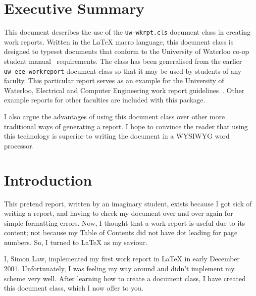 \documentclass{uw-wkrpt}
\begin{document}
\onehalfspacing
\section*{Executive Summary}
{}

\setcounter{page}{3}

This document describes the use of the \texttt{uw-wkrpt.cls}
document class in creating work reports.  Written in the 
\LaTeX{} macro language, this document class is designed to typeset 
documents that conform to the University of Waterloo co-op student 
manual~\cite{ref:coopman} requirements.  The class has been generalised
from the earlier \texttt{uw-ece-workreport} document class so that it
may be used by students of any faculty.  This particular report 
serves as an example for the University of Waterloo, Electrical and 
Computer Engineering work report guidelines~\cite{ref:eceguidelines}.  
Other example reports for other faculties are included with this package.

I also argue the advantages of using this document class over other
more traditional ways of generating a report.  I hope to convince the
reader that using this technology is superior to writing the document
in a WYSIWYG word processor.

\clearpage
{}
\tableofcontents
\clearpage
{}
\listoffigures
\clearpage
{}
\listoftables

\clearpage
{}
\onehalfspacing

\section{Introduction}\label{sec:intro}
This pretend report, written by an imaginary student,
exists because I got sick of writing a report,
and having to check my document over and over again for simple
formatting errors.  Now, I thought that a work report is useful
due to its content; not because my Table of Contents did not have dot
leading for page numbers.  So, I turned to \LaTeX{} as my saviour.

I, Simon Law, implemented my first work report in \LaTeX{} in early
December 2001.  Unfortunately, I was feeling my way around and didn't
implement my scheme very well.  After learning how to create a
document class, I have created this document class, which I now offer 
to you.
\end{document}
